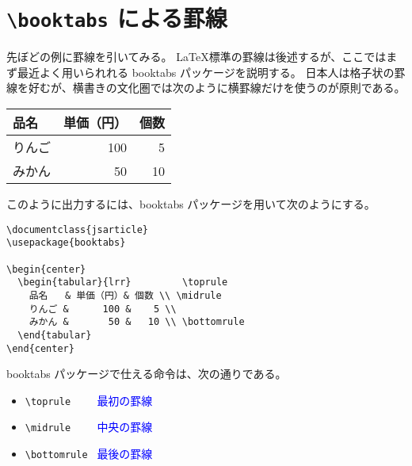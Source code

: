 \section{\texttt{\textbackslash{}booktabs} による罫線}
先ぼどの例に罫線を引いてみる。
\LaTeX{}標準の罫線は後述するが、ここではまず最近よく用いられれる booktabs パッケージを説明する。
日本人は格子状の罫線を好むが、横書きの文化圏では次のように横罫線だけを使うのが原則である。
\begin{center}
  \begin{tabular}{lrr}           \toprule
    品名   & 単価（円）& 個数 \\ \midrule
    りんご &       100 &    5 \\
    みかん &        50 &   10 \\ \bottomrule
  \end{tabular}
\end{center}
このように出力するには、booktabs パッケージを用いて次のようにする。
\begin{mdframed}[roundcorner=0.50zw,leftmargin=3.00zw,rightmargin=3.00zw,skipabove=0.40zw,skipbelow=0.40zw,innertopmargin=4.00pt,innerbottommargin=4.00pt,innerleftmargin=5.00pt,innerrightmargin=5.00pt,linecolor=gray!020,linewidth=0.50pt,backgroundcolor=gray!20]
\begin{verbatim}
\documentclass{jsarticle}
\usepackage{booktabs}

\begin{center}
  \begin{tabular}{lrr}         \toprule
    品名   & 単価（円）& 個数 \\ \midrule
    りんご &      100 &    5 \\
    みかん &       50 &   10 \\ \bottomrule
  \end{tabular}
\end{center}
\end{verbatim}
\end{mdframed}
booktabs パッケージで仕える命令は、次の通りである。
\begin{itemize}\setlength{\leftskip}{-1.00zw}%
\item \texttt{\textbackslash{}toprule~~~~} \textcolor{blue}{最初の罫線}
\item \texttt{\textbackslash{}midrule~~~~} \textcolor{blue}{中央の罫線}
\item \texttt{\textbackslash{}bottomrule~} \textcolor{blue}{最後の罫線}
\end{itemize}
